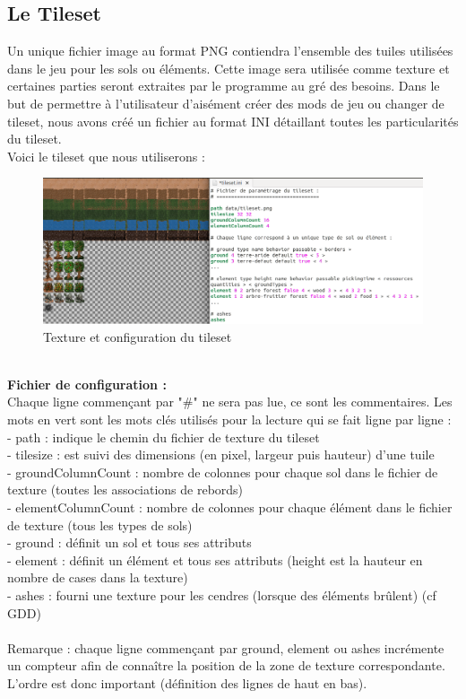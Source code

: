 \documentclass[a4paper]{article}
\newcommand{\alinea}{\hspace*{0.5cm}}
\begin{document}
      \subsection{Le Tileset}
		\label{TilesetDev}
		\alinea Un unique fichier image au format PNG contiendra l'ensemble des tuiles utilisées dans le jeu pour les sols ou éléments. Cette image sera utilisée comme texture et certaines parties seront extraites par le programme au gré des besoins.
		\alinea Dans le but de permettre à l'utilisateur d'aisément créer des mods de jeu ou changer de tileset, nous avons créé un fichier au format INI détaillant toutes les particularités du tileset.\\
		\alinea Voici le tileset que nous utiliserons :\\
        \begin{figure}
          \begin{center}
            \includegraphics[scale=0.35]{TilesetPngIni.png}
          \end{center}
          \label{TilesetPngIni}
          \caption{Texture et configuration du tileset}
        \end{figure}
        \\
        \textbf{Fichier de configuration :}\\
        \alinea Chaque ligne commençant par "\#" ne sera pas lue, ce sont les commentaires. Les mots en vert sont les mots clés utilisés pour la lecture qui se fait ligne par ligne :\\
        - path : indique le chemin du fichier de texture du tileset\\
        - tilesize : est suivi des dimensions (en pixel, largeur puis hauteur) d'une tuile\\
        - groundColumnCount : nombre de colonnes pour chaque sol dans le fichier de texture (toutes les associations de rebords)\\
        - elementColumnCount : nombre de colonnes pour chaque élément dans le fichier de texture (tous les types de sols)\\
        - ground : définit un sol et tous ses attributs\\
        - element : définit un élément et tous ses attributs (height est la hauteur en nombre de cases dans la texture)\\
        - ashes : fourni une texture pour les cendres (lorsque des éléments brûlent) (cf GDD)\\
        \\
        Remarque : chaque ligne commençant par ground, element ou ashes incrémente un compteur afin de connaître la position de la zone de texture correspondante. L'ordre est donc important (définition des lignes de haut en bas).
        
\end{document}
